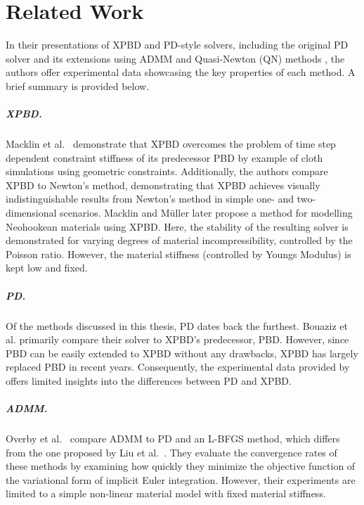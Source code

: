 \chapter{Related Work}\label{ch:related-work}
In their presentations of XPBD \cite{macklin2016} and PD-style solvers, including the original PD solver \cite{bouaziz2014} and its 
extensions using ADMM \cite{overby2017} and Quasi-Newton (QN) methods \cite{liu2017}, the authors offer experimental data showcasing 
the key properties of each method. A brief summary is provided below.

\paragraph{XPBD.}
Macklin et al.\ \cite{macklin2016} demonstrate that XPBD overcomes the problem of time step dependent constraint stiffness of its 
predecessor PBD \cite{mueller2006} by example of cloth simulations using geometric constraints. Additionally, the authors compare 
XPBD to Newton's method, demonstrating that XPBD achieves visually indistinguishable results from Newton's method in simple one- 
and two-dimensional scenarios. Macklin and Müller \cite{macklin2021} later propose a method for modelling Neohookean materials using 
XPBD. Here, the stability of the resulting solver is demonstrated for varying degrees of material incompressibility, controlled by 
the Poisson ratio. However, the material stiffness (controlled by Youngs Modulus) is kept low and fixed.

\paragraph{PD.}
Of the methods discussed in this thesis, PD dates back the furthest. Bouaziz et al. \cite{bouaziz2014} primarily compare their solver 
to XPBD's predecessor, PBD. However, since PBD can be easily extended to XPBD without any drawbacks, XPBD has largely replaced PBD 
in recent years. Consequently, the experimental data provided by \cite{bouaziz2014} offers limited insights into the differences 
between PD and XPBD.

\paragraph{ADMM.}
Overby et al.\ \cite{overby2017} compare ADMM to PD and an L-BFGS method, which differs from the one proposed by Liu et al.\ 
\cite{liu2017}. They evaluate the convergence rates of these methods by examining how quickly they minimize the objective function of 
the variational form of implicit Euler integration. However, their experiments are limited to a simple non-linear material model 
with fixed material stiffness.

